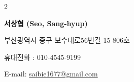 \documentclass[11pt]{article} %
\def\KoreanMode{0}
\begin{document}
\newcommand\profile{
	{\LARGE\bfseries 서상협 (Seo, Sang-hyup)} %
	\bigskip\bigskip\medskip %
	
	부산광역시 중구 보수대로56번길 15 806호 %
	\medskip %
	
	휴대전화 : 010-4545-9199 %
	\medskip %
	
	E-mail: \href{mailto:saibie1677@gmail.com}{saibie1677@gmail.com}\\ %
}

\newcommand\profileeng{
	{\LARGE\bfseries Seo, Sang-hyup (서상협)} %
	\bigskip\bigskip\medskip %
	
	48973, No.806, 15, Bosu-daero 56beon-gil, Jung-gu, Busan, Republic of Korea %
	\medskip %
	
	Mobile : 010-4545-9199 %
	\medskip %
	
	E-mail: \href{mailto:saibie1677@gmail.com}{saibie1677@gmail.com}\\ %
}





%

\if\KoreanMode2
\else
\profile

%
\end{document}
